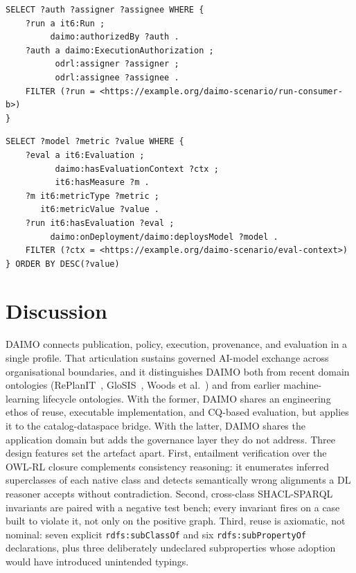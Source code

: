 \documentclass[Afour,sagev,times]{sagej}
\newcommand{\code}[1]{\texttt{#1}}
\begin{document}
\begin{lstlisting}[label=lst:cq-g3,caption={CQ-G3: authorisation and agreement for a specific run.}]
SELECT ?auth ?assigner ?assignee WHERE {
    ?run a it6:Run ;
         daimo:authorizedBy ?auth .
    ?auth a daimo:ExecutionAuthorization ;
          odrl:assigner ?assigner ;
          odrl:assignee ?assignee .
    FILTER (?run = <https://example.org/daimo-scenario/run-consumer-b>)
}
\end{lstlisting}

\begin{lstlisting}[label=lst:cq-v3,caption={CQ-V3: ranking of models under a shared evaluation context.}]
SELECT ?model ?metric ?value WHERE {
    ?eval a it6:Evaluation ;
          daimo:hasEvaluationContext ?ctx ;
          it6:hasMeasure ?m .
    ?m it6:metricType ?metric ;
       it6:metricValue ?value .
    ?run it6:hasEvaluation ?eval ;
         daimo:onDeployment/daimo:deploysModel ?model .
    FILTER (?ctx = <https://example.org/daimo-scenario/eval-context>)
} ORDER BY DESC(?value)
\end{lstlisting}


\section{Discussion}\label{sec:discussion}

DAIMO connects publication, policy, execution, provenance, and evaluation in a single profile. That articulation sustains governed AI-model exchange across organisational boundaries, and it distinguishes DAIMO both from recent domain ontologies (RePlanIT~\cite{kurteva}, GloSIS~\cite{palma}, Woods et al.~\cite{woods}) and from earlier machine-learning lifecycle ontologies. With the former, DAIMO shares an engineering ethos of reuse, executable implementation, and CQ-based evaluation, but applies it to the catalog-dataspace bridge. With the latter, DAIMO shares the application domain but adds the governance layer they do not address. Three design features set the artefact apart. First, entailment verification over the OWL-RL closure complements consistency reasoning: it enumerates inferred superclasses of each native class and detects semantically wrong alignments a DL reasoner accepts without contradiction. Second, cross-class SHACL-SPARQL invariants are paired with a negative test bench; every invariant fires on a case built to violate it, not only on the positive graph. Third, reuse is axiomatic, not nominal: seven explicit \code{rdfs:subClassOf} and six \code{rdfs:subPropertyOf} declarations, plus three deliberately undeclared subproperties whose adoption would have introduced unintended typings.
\end{document}
